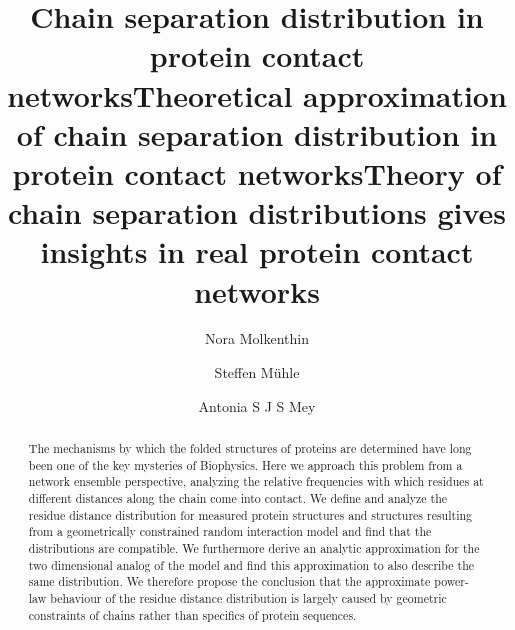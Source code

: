 \documentclass[
reprint,
twocolumn,
amsmath,amssymb,superscriptaddress,aps,
pre]{revtex4-1}
\begin{document}
\title{Chain separation distribution in protein contact networks}
\title{Theoretical approximation of chain separation distribution in protein contact networks}
\title{Theory of chain separation distributions gives insights in real protein contact networks}
\author{Nora Molkenthin}
\author{Steffen Mühle}
\author{Antonia S J S Mey}

\begin{abstract}
The mechanisms by which the folded structures of proteins are determined have long been one of the key mysteries of Biophysics. Here we approach this problem from a network ensemble perspective, analyzing the relative frequencies with which residues at different distances along the chain come into contact. We define and analyze the residue distance distribution for measured protein structures and structures resulting from a geometrically constrained random interaction model and find that the distributions are compatible. We furthermore derive an analytic approximation for the two dimensional analog of the model and find this approximation to also describe the same distribution. We therefore propose the conclusion that the approximate power-law behaviour of the residue distance distribution is largely caused by geometric constraints of chains rather than specifics of protein sequences.
\end{abstract}
\maketitle
\end{document}
